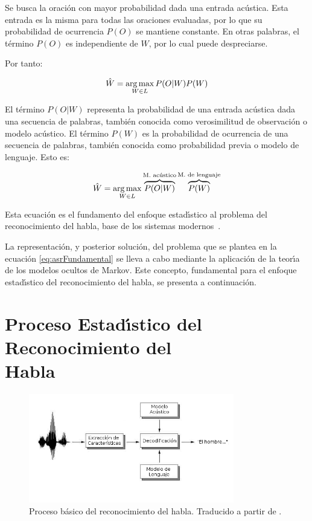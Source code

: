 Se busca la oraci\'on con mayor probabilidad dada una entrada ac\'ustica. Esta entrada es
la misma para todas las oraciones evaluadas, por lo que su probabilidad de ocurrencia $P(O)$ se mantiene constante.
En otras palabras, el t\'ermino $P(O)$ es independiente de $W$, por lo cual puede despreciarse. 

Por tanto:

\begin{align}
\hat{W} = \operatorname*{arg\,max}_{W \in L} P(O|W)P(W)
\end{align}

El t\'ermino $P(O|W)$ representa la probabilidad de una entrada ac\'ustica dada una secuencia de palabras, tambi\'en
conocida como verosimilitud de observaci\'on o modelo ac\'ustico. El t\'ermino $P(W)$ es la probabilidad 
 de ocurrencia de una secuencia de palabras, tambi\'en conocida como probabilidad previa o 
modelo de lenguaje. Esto es:

\begin{align}
\hat{W} = \operatorname*{arg\,max}_{W \in L} \overbrace{P(O|W)}^\text{M. ac\'ustico}\overbrace{P(W)}^\text{M. de lenguaje}
\label{eq:asrFundamental}
\end{align}

Esta ecuaci\'on es el fundamento del enfoque estad{\'\i}stico al problema del reconocimiento del habla, base de los
sistemas \mbox{modernos \cite{RabinerStatistical2006}}.

La representaci\'on, y posterior soluci\'on, del problema que se plantea en la ecuaci\'on \ref{eq:asrFundamental} se
lleva a cabo mediante la aplicaci\'on de la teor{\'\i}a de los modelos ocultos de Markov. Este concepto, fundamental
para el enfoque estad{\'\i}stico del reconocimiento del habla, se presenta a continuaci\'on.


\section[Proceso Estad{\'\i}stico del Reconocimiento del Habla]
{Proceso Estad{\'\i}stico del Reconocimiento del \\Habla}


\begin{figure}[H] 
\centering
\includegraphics[width=0.8\textwidth]{./graphics/proceso.png}
\caption{Proceso b\'asico del reconocimiento del habla. Traducido a partir de \cite{VerenichASR}.}
\label{figure:proceso}
\end{figure}

